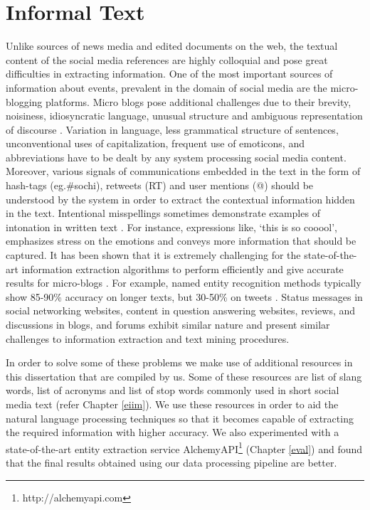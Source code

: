 \section{Informal Text}
Unlike sources of news media and edited documents on the web, the textual content of the social media references are highly colloquial and pose great difficulties in extracting information. One of the most important sources of information about events, prevalent in the domain of social media are the micro-blogging platforms. Micro blogs pose additional challenges due to their brevity, noisiness, idiosyncratic language, unusual structure and ambiguous representation of discourse \cite{bontcheva2013twitie}. Variation in language, less grammatical structure of sentences, unconventional uses of capitalization, frequent use of emoticons, and abbreviations have to be dealt by any system processing social media content. Moreover, various signals of communications embedded in the text in the form of hash-tags (eg.\#sochi), retweets (RT) and user mentions (@) should be understood by the system in order to extract the contextual information hidden in the text. Intentional misspellings sometimes demonstrate examples of intonation in written text \cite{prevost1996information}. For instance, expressions like, `this is so cooool', emphasizes stress on the emotions and conveys more information that should be captured. It has been shown that it is extremely challenging for the state-of-the-art information extraction algorithms to perform efficiently and give accurate results for micro-blogs \cite{derczynski2013microblog}. For example, named entity recognition methods typically show 85-90\% accuracy on longer texts, but 30-50\% on tweets \cite{ritter2011named}. Status messages in social networking websites, content in question answering websites, reviews, and discussions in blogs, and forums exhibit similar nature and present similar challenges to information extraction and text mining procedures.

In order to solve some of these problems we make use of additional resources in this dissertation that are compiled by us. Some of these resources are list of slang words, list of acronyms and list of stop words commonly used in short social media text (refer Chapter \ref{eiim}). We use these resources in order to aid the natural language processing techniques so that it becomes capable of extracting the required information with higher accuracy. We also experimented with a state-of-the-art entity extraction service AlchemyAPI\footnote{http://alchemyapi.com} (Chapter \ref{eval}) and found that the final results obtained using our data processing pipeline are better.



